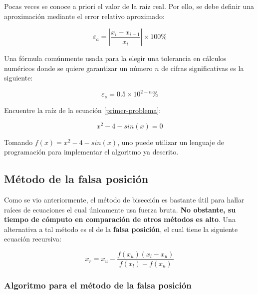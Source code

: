 Pocas veces se conoce a priori el valor de la raíz real. Por ello, se
debe definir una aproximación mediante el error relativo aproximado:

\[
	\varepsilon_a = \left| \frac{x_i - x_{i-1}}{x_i} \right| \times 100\%
\]

Una fórmula comúnmente usada para la elegir una tolerancia en cálculos numéricos
donde se quiere garantizar un número $n$ de cifras significativas es la
siguiente:

\[
	\varepsilon_s = 0.5 \times 10^{2-n} \%
\]

\begin{ex}

	Encuentre la raíz de la ecuación \ref{primer-problema}:

	\[
		x^2 - 4 - sin(x) = 0
	\]

	\begin{solution}
		Tomando $f(x) = x^2 - 4 - sin(x)$, uno puede utilizar un
		lenguaje de programación para implementar el algoritmo ya
		descrito.

		

		
	\end{solution}
	
\end{ex}

\subsection{Método de la falsa posición}

Como se vio anteriormente, el método de bisección es bastante útil para hallar
raíces de ecuaciones el cual únicamente usa fuerza bruta. \textbf{No obstante,
su tiempo de cómputo en comparación de otros métodos es alto}. Una alternativa a
tal método es el de la \textbf{falsa posición}, el cual tiene la siguiente ecuación
recursiva:

\[
	x_r = x_u - \frac{f(x_u) (x_l-x_u)}{f(x_l) - f(x_u)}
\]

\subsubsection{Algoritmo para el método de la falsa posición}

